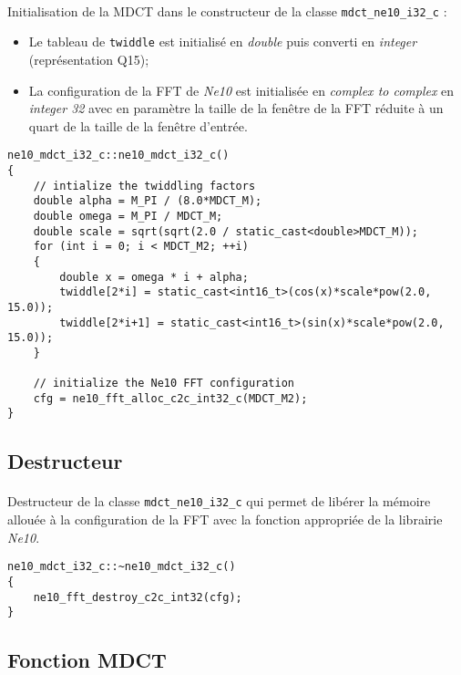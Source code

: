 \documentclass{article}
\begin{document}
\paragraph{}
Initialisation de la MDCT dans le constructeur de la classe \texttt{mdct\_ne10\_i32\_c} :
\begin{itemize}
    \item Le tableau de \texttt{twiddle} est initialisé en \emph{double} puis converti en \emph{integer} (représentation Q15);
    \item La configuration de la FFT de \emph{Ne10} est initialisée en \emph{complex to complex} en \emph{integer 32} avec en paramètre la taille de la fenêtre de la FFT réduite à un quart de la taille de la fenêtre d'entrée.
\end{itemize}
\lstset{language=C++}
\begin{lstlisting}
ne10_mdct_i32_c::ne10_mdct_i32_c()
{
    // intialize the twiddling factors
    double alpha = M_PI / (8.0*MDCT_M);
    double omega = M_PI / MDCT_M;
    double scale = sqrt(sqrt(2.0 / static_cast<double>MDCT_M));
    for (int i = 0; i < MDCT_M2; ++i)
    {
        double x = omega * i + alpha;
        twiddle[2*i] = static_cast<int16_t>(cos(x)*scale*pow(2.0, 15.0));
        twiddle[2*i+1] = static_cast<int16_t>(sin(x)*scale*pow(2.0, 15.0));
    }

    // initialize the Ne10 FFT configuration
    cfg = ne10_fft_alloc_c2c_int32_c(MDCT_M2);
}
\end{lstlisting}

\subsection{Destructeur}\label{app:mdct_ne10_i32_c_destructor}
\paragraph{}
Destructeur de la classe \texttt{mdct\_ne10\_i32\_c} qui permet de libérer la mémoire allouée à la configuration de la FFT avec la fonction appropriée de la librairie \emph{Ne10}.
\lstset{language=C++}
\begin{lstlisting}
ne10_mdct_i32_c::~ne10_mdct_i32_c()
{
    ne10_fft_destroy_c2c_int32(cfg);
}
\end{lstlisting}

\subsection{Fonction MDCT}\label{app:mdct_ne10_i32_c_func}
\end{document}
